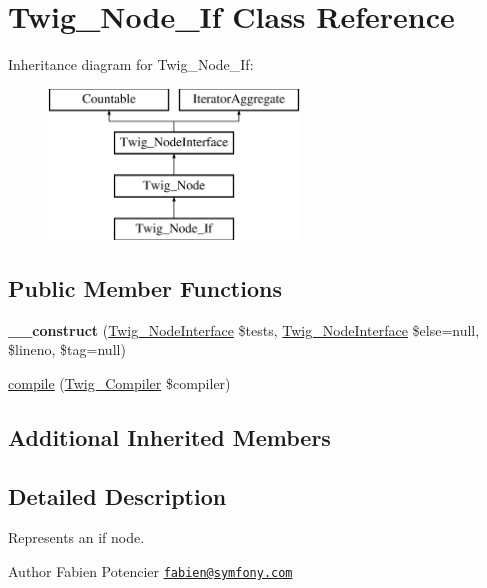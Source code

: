 \hypertarget{classTwig__Node__If}{}\section{Twig\+\_\+\+Node\+\_\+\+If Class Reference}
\label{classTwig__Node__If}
Inheritance diagram for Twig\+\_\+\+Node\+\_\+\+If\+:\begin{figure}[H]
\begin{center}
\leavevmode
\includegraphics[height=4.000000cm]{classTwig__Node__If}
\end{center}
\end{figure}
\subsection*{Public Member Functions}
\begin{DoxyCompactItemize}
\item 
{\bfseries \+\_\+\+\_\+construct} (\hyperlink{interfaceTwig__NodeInterface}{Twig\+\_\+\+Node\+Interface} \$tests, \hyperlink{interfaceTwig__NodeInterface}{Twig\+\_\+\+Node\+Interface} \$else=null, \$lineno, \$tag=null)\hypertarget{classTwig__Node__If_ac5b4ef9a499452b5d1dacdf0b8885e7c}{}\label{classTwig__Node__If_ac5b4ef9a499452b5d1dacdf0b8885e7c}

\item 
\hyperlink{classTwig__Node__If_a7a584148443494a02b9ea75efa1fcc85}{compile} (\hyperlink{classTwig__Compiler}{Twig\+\_\+\+Compiler} \$compiler)
\end{DoxyCompactItemize}
\subsection*{Additional Inherited Members}


\subsection{Detailed Description}
Represents an if node.

\begin{DoxyAuthor}{Author}
Fabien Potencier \href{mailto:fabien@symfony.com}{\tt fabien@symfony.\+com} 
\end{DoxyAuthor}


